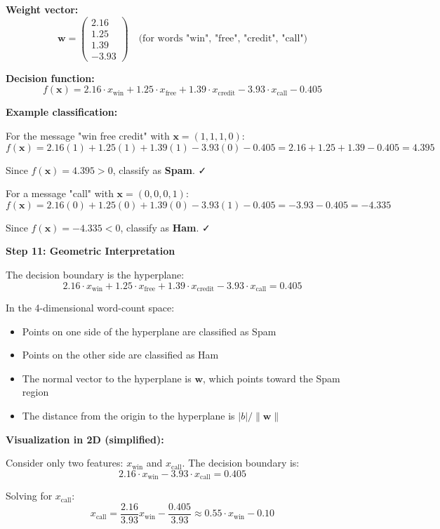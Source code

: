 \documentclass[12pt]{article}
\begin{document}
\begin{solution}
\textbf{Weight vector:}
\[
\mathbf{w} = \begin{pmatrix}
2.16 \\
1.25 \\
1.39 \\
-3.93
\end{pmatrix} \quad \text{(for words "win", "free", "credit", "call")}
\]

\textbf{Decision function:}
\[
f(\mathbf{x}) = 2.16 \cdot x_{\text{win}} + 1.25 \cdot x_{\text{free}} + 1.39 \cdot x_{\text{credit}} - 3.93 \cdot x_{\text{call}} - 0.405
\]

\textbf{Example classification:}

For the message "win free credit" with $\mathbf{x} = (1, 1, 1, 0)$:
\[
f(\mathbf{x}) = 2.16(1) + 1.25(1) + 1.39(1) - 3.93(0) - 0.405 = 2.16 + 1.25 + 1.39 - 0.405 = 4.395
\]

Since $f(\mathbf{x}) = 4.395 > 0$, classify as \textbf{Spam}. ✓

For a message "call" with $\mathbf{x} = (0, 0, 0, 1)$:
\[
f(\mathbf{x}) = 2.16(0) + 1.25(0) + 1.39(0) - 3.93(1) - 0.405 = -3.93 - 0.405 = -4.335
\]

Since $f(\mathbf{x}) = -4.335 < 0$, classify as \textbf{Ham}. ✓

\textbf{Step 11: Geometric Interpretation}

The decision boundary is the hyperplane:
\[
2.16 \cdot x_{\text{win}} + 1.25 \cdot x_{\text{free}} + 1.39 \cdot x_{\text{credit}} - 3.93 \cdot x_{\text{call}} = 0.405
\]

In the 4-dimensional word-count space:
\begin{itemize}
    \item Points on one side of the hyperplane are classified as Spam
    \item Points on the other side are classified as Ham
    \item The normal vector to the hyperplane is $\mathbf{w}$, which points toward the Spam region
    \item The distance from the origin to the hyperplane is $|b| / \|\mathbf{w}\|$
\end{itemize}

\textbf{Visualization in 2D (simplified):}

Consider only two features: $x_{\text{win}}$ and $x_{\text{call}}$. The decision boundary is:
\[
2.16 \cdot x_{\text{win}} - 3.93 \cdot x_{\text{call}} = 0.405
\]

Solving for $x_{\text{call}}$:
\[
x_{\text{call}} = \frac{2.16}{3.93} x_{\text{win}} - \frac{0.405}{3.93} \approx 0.55 \cdot x_{\text{win}} - 0.10
\]


\end{solution}
\end{document}
